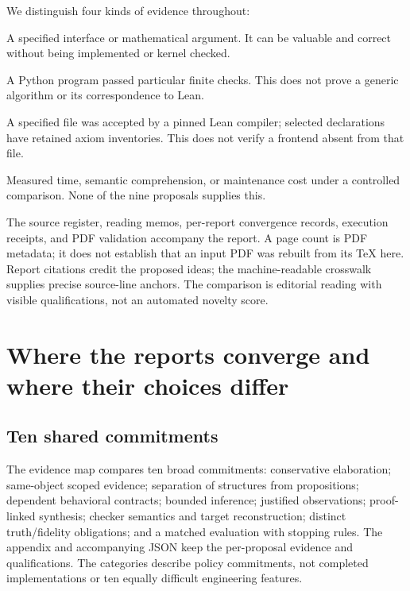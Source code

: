 \documentclass[11pt,letterpaper]{article}
\theoremstyle{definition}\newtheorem{definition}[proposition]{Definition}
\theoremstyle{remark}\newtheorem{remark}[proposition]{Remark}
\begin{document}
We distinguish four kinds of evidence throughout:
\begin{description}[style=nextline]
\item[Design or written proof] A specified interface or mathematical argument.
It can be valuable and correct without being implemented or kernel checked.
\item[Executed finite model] A Python program passed particular finite checks.
This does not prove a generic algorithm or its correspondence to Lean.
\item[Fresh Lean acceptance] A specified file was accepted by a pinned Lean
compiler; selected declarations have retained axiom inventories. This does not
verify a frontend absent from that file.
\item[Authoring evidence] Measured time, semantic comprehension, or maintenance
cost under a controlled comparison. None of the nine proposals supplies this.
\end{description}

The source register, reading memos, per-report convergence records, execution
receipts, and PDF validation accompany the report. A page count is PDF metadata;
it does not establish that an input PDF was rebuilt from its TeX here. Report
citations credit the proposed ideas; the machine-readable crosswalk supplies
precise source-line anchors. The comparison is editorial reading with visible
qualifications, not an automated novelty score.

\section{Where the reports converge and where their choices differ}\label{sec:comparison}

\subsection{Ten shared commitments}
The evidence map compares ten broad commitments: conservative elaboration;
same-object scoped evidence; separation of structures from propositions;
dependent behavioral contracts; bounded inference; justified observations;
proof-linked synthesis; checker semantics and target reconstruction; distinct
truth/fidelity obligations; and a matched evaluation with stopping rules.
The appendix and accompanying JSON keep the per-proposal evidence and
qualifications. The categories describe policy commitments, not completed
implementations or ten equally difficult engineering features.
\end{document}
